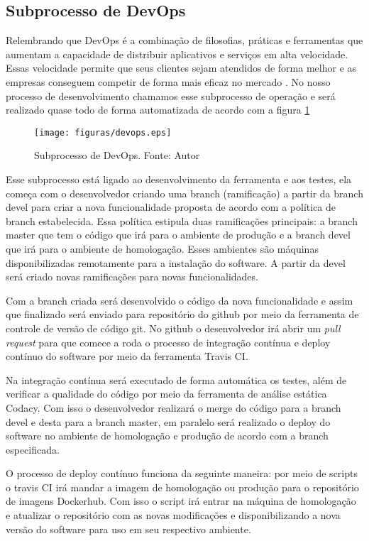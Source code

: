 \subsection{Subprocesso de DevOps}

Relembrando que DevOps é a combinação de filosofias, práticas e ferramentas que aumentam a capacidade de distribuir aplicativos e serviços em alta velocidade. Essas velocidade permite que seus clientes sejam atendidos de forma melhor e as empresas conseguem competir de forma mais eficaz no mercado \cite{amazon}. No nosso processo de desenvolvimento chamamos esse subprocesso de operação e será realizado quase todo de forma automatizada de acordo com a figura \ref{fig:devops}

\begin{figure}[H]
	\centering
  \texttt{[image: figuras/devops.eps]}
  \caption[Subprocesso de DevOps.]{Subprocesso de DevOps. Fonte: Autor}
	\label{fig:devops}
\end{figure}

Esse subprocesso está ligado ao desenvolvimento da ferramenta e aos testes, ela começa com o desenvolvedor criando uma branch (ramificação) a partir da branch devel para criar a nova funcionalidade proposta de acordo com a política de branch estabelecida. Essa política estipula duas ramificações principais: a branch master que tem o código que irá para o ambiente de produção e a branch devel que irá para o ambiente de homologação. Esses ambientes são máquinas disponibilizadas remotamente para a instalação do software. A partir da devel será criado novas ramificações para novas funcionalidades.

Com a branch criada será desenvolvido o código da nova funcionalidade e assim que finalizado será enviado para repositório do github por meio da ferramenta de controle de versão de código git. No github o desenvolvedor irá abrir um \textit{pull request} para que comece a roda o processo de integração contínua e deploy contínuo do software por meio da ferramenta Travis CI.

Na integração contínua será executado de forma automática os testes, além de verificar a qualidade do código por meio da ferramenta de análise estática Codacy. Com isso o desenvolvedor realizará o merge do código para a branch devel e desta para a branch master, em paralelo será realizado o deploy do software no ambiente de homologação e produção de acordo com a branch especificada.

O processo de deploy contínuo funciona da seguinte maneira: por meio de scripts o travis CI irá mandar a imagem de homologação ou produção para o repositório de imagens Dockerhub. Com isso o script irá entrar na máquina de homologação e atualizar o repositório com as novas modificações e disponibilizando a nova versão do software para uso em seu respectivo ambiente.

